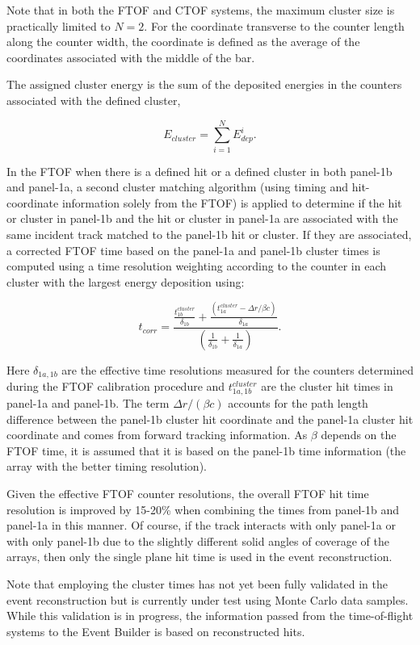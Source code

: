 \noindent
Note that in both the FTOF and CTOF systems, the maximum cluster size is practically limited to $N=2$. For the
coordinate transverse to the counter length along the counter width, the coordinate is defined as the average of
the coordinates associated with the middle of the bar.

The assigned cluster energy is the sum of the deposited energies in the counters associated with the defined
cluster,

\begin{equation}
  E_{cluster} = \sum_{i=1}^N E_{dep}^i.
\end{equation}

In the FTOF when there is a defined hit or a defined cluster in both panel-1b and panel-1a, a second cluster matching
algorithm (using timing and hit-coordinate information solely from the FTOF) is applied to determine if the hit
or cluster in panel-1b and the hit or cluster in panel-1a are associated with the same incident track matched to
the panel-1b hit or cluster. If they are associated, a corrected FTOF time based on the panel-1a and panel-1b
cluster times is computed using a time resolution weighting according to the counter in each cluster with the
largest energy deposition using:

\begin{equation}
  t_{corr} = \frac{\displaystyle \frac{\displaystyle t_{1b}^{cluster}}{\displaystyle \delta_{1b}} +
    \frac{\displaystyle (t_{1a}^{cluster} - \Delta r/\beta c)}{\displaystyle \delta_{1a}}}
  {\displaystyle \left( \frac{\displaystyle 1}{\displaystyle \delta_{1b}} +
    \frac{\displaystyle 1}{\displaystyle \delta_{1a}} \right)}.
\end{equation}

\noindent
Here $\delta_{1a,1b}$ are the effective time resolutions measured for the counters determined during the
FTOF calibration procedure and $t_{1a,1b}^{cluster}$ are the cluster hit times in panel-1a and panel-1b. The term
$\Delta r/(\beta c)$ accounts for the path length difference between the panel-1b cluster hit coordinate and
the panel-1a cluster hit coordinate and comes from forward tracking information. As $\beta$ depends on the
FTOF time, it is assumed that it is based on the panel-1b time information (the array with the better timing
resolution).

Given the effective FTOF counter resolutions, the overall FTOF hit time resolution is improved by 15-20\%
when combining the times from panel-1b and panel-1a in this manner. Of course, if the track interacts with only
panel-1a or with only panel-1b due to the slightly different solid angles of coverage of the arrays, then only the
single plane hit time is used in the event reconstruction. 

Note that employing the cluster times has not yet been fully validated in the event reconstruction but is currently
under test using Monte Carlo data samples. While this validation is in progress, the information passed from the
time-of-flight systems to the Event Builder is based on reconstructed hits.
